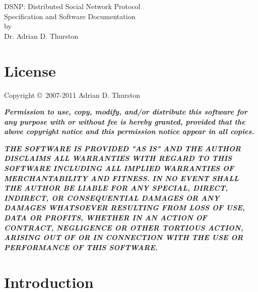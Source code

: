 \documentclass[letterpaper,11pt,oneside]{article}
\begin{document}
%
%
\thispagestyle{empty}
\begin{center}
{\huge DSNP: Distributed Social Network Protocol}\\
\vspace*{12pt}
{\Large Specification and Software Documentation}\\
\vspace{12pt}
by\\
\vspace{12pt}
{\large Dr. Adrian D. Thurston}\\
\end{center}


\section*{License}

Copyright \copyright\ 2007-2011 Adrian D. Thurston

\vspace{5pt}

{\bf\it\noindent Permission to use, copy, modify, and/or distribute this software for any
purpose with or without fee is hereby granted, provided that the above
copyright notice and this permission notice appear in all copies.}

\vspace{5pt}

{\bf\it\noindent THE SOFTWARE IS PROVIDED "AS IS" AND THE AUTHOR DISCLAIMS ALL WARRANTIES
WITH REGARD TO THIS SOFTWARE INCLUDING ALL IMPLIED WARRANTIES OF
MERCHANTABILITY AND FITNESS. IN NO EVENT SHALL THE AUTHOR BE LIABLE FOR
ANY SPECIAL, DIRECT, INDIRECT, OR CONSEQUENTIAL DAMAGES OR ANY DAMAGES
WHATSOEVER RESULTING FROM LOSS OF USE, DATA OR PROFITS, WHETHER IN AN
ACTION OF CONTRACT, NEGLIGENCE OR OTHER TORTIOUS ACTION, ARISING OUT OF
OR IN CONNECTION WITH THE USE OR PERFORMANCE OF THIS SOFTWARE.}

\tableofcontents

%
%


%
%
%


\section{Introduction}
\end{document}
